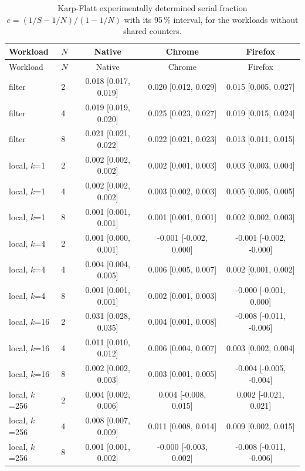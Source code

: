 {\small
\begin{longtable}{llccc}
\caption{Karp-Flatt experimentally determined serial fraction $e=(1/S-1/N)/(1-1/N)$ with its 95\,\% interval, for the workloads without shared counters.}\label{tab:karp-flatt} \\
\toprule
Workload & $N$ & Native & Chrome & Firefox \\
\midrule
\endfirsthead
\toprule
Workload & $N$ & Native & Chrome & Firefox \\
\midrule
\endhead
\bottomrule
\endfoot
filter & 2 & 0.018 [0.017, 0.019] & 0.020 [0.012, 0.029] & 0.015 [0.005, 0.027] \\
filter & 4 & 0.019 [0.019, 0.020] & 0.025 [0.023, 0.027] & 0.019 [0.015, 0.024] \\
filter & 8 & 0.021 [0.021, 0.022] & 0.022 [0.021, 0.023] & 0.013 [0.011, 0.015] \\
\midrule
local, $k$=1 & 2 & 0.002 [0.002, 0.002] & 0.002 [0.001, 0.003] & 0.003 [0.003, 0.004] \\
local, $k$=1 & 4 & 0.002 [0.002, 0.002] & 0.003 [0.002, 0.003] & 0.005 [0.005, 0.005] \\
local, $k$=1 & 8 & 0.001 [0.001, 0.001] & 0.001 [0.001, 0.001] & 0.002 [0.002, 0.003] \\
\midrule
local, $k$=4 & 2 & 0.001 [0.000, 0.001] & -0.001 [-0.002, 0.000] & -0.001 [-0.002, -0.000] \\
local, $k$=4 & 4 & 0.004 [0.004, 0.005] & 0.006 [0.005, 0.007] & 0.002 [0.001, 0.002] \\
local, $k$=4 & 8 & 0.001 [0.001, 0.001] & 0.002 [0.001, 0.003] & -0.000 [-0.001, 0.000] \\
\midrule
local, $k$=16 & 2 & 0.031 [0.028, 0.035] & 0.004 [0.001, 0.008] & -0.008 [-0.011, -0.006] \\
local, $k$=16 & 4 & 0.011 [0.010, 0.012] & 0.006 [0.004, 0.007] & 0.003 [0.002, 0.004] \\
local, $k$=16 & 8 & 0.002 [0.002, 0.003] & 0.003 [0.001, 0.005] & -0.004 [-0.005, -0.004] \\
\midrule
local, $k$=256 & 2 & 0.004 [0.002, 0.006] & 0.004 [-0.008, 0.015] & 0.002 [-0.021, 0.021] \\
local, $k$=256 & 4 & 0.008 [0.007, 0.009] & 0.011 [0.008, 0.014] & 0.009 [0.002, 0.015] \\
local, $k$=256 & 8 & 0.001 [0.001, 0.002] & -0.000 [-0.003, 0.002] & -0.008 [-0.011, -0.006] \\
\end{longtable}
}
